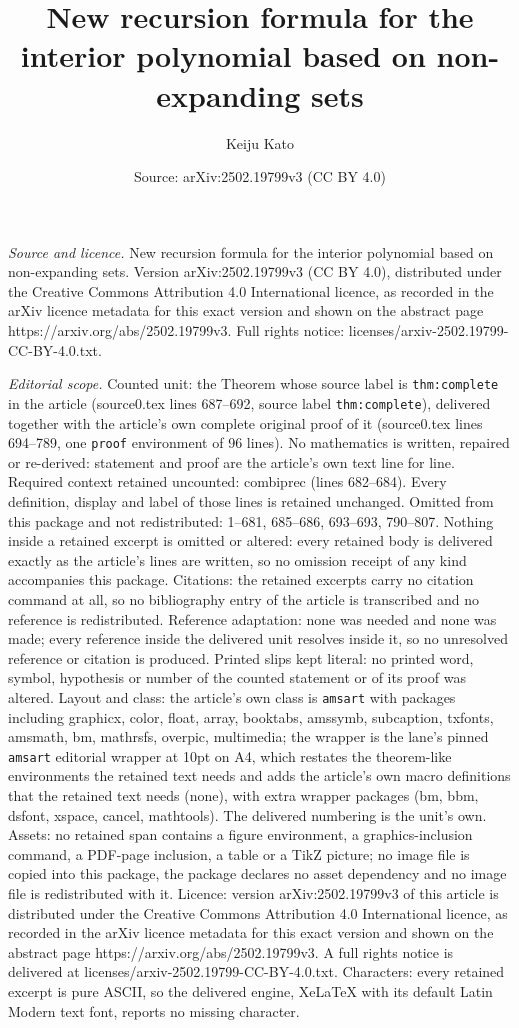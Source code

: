 \documentclass[10pt,a4paper]{amsart}
\title[New recursion formula for the interior polynomial based on n]{New recursion formula for the interior polynomial based on non-expanding sets}
\author{Keiju Kato}
\date{Source: arXiv:2502.19799v3 (CC BY 4.0)}
\begin{document}
\maketitle

\noindent\emph{Source and licence.} New recursion formula for the interior polynomial based on non-expanding sets. Version arXiv:2502.19799v3 (CC BY 4.0), distributed under the Creative Commons Attribution 4.0 International licence, as recorded in the arXiv licence metadata for this exact version and shown on the abstract page https://arxiv.org/abs/2502.19799v3. Full rights notice: licenses/arxiv-2502.19799-CC-BY-4.0.txt.\par\smallskip

\noindent\textit{Editorial scope.} Counted unit: the Theorem whose source label is \texttt{thm:complete} in the article (source0.tex lines 687--692, source label \texttt{thm:complete}), delivered together with the article's own complete original proof of it (source0.tex lines 694--789, one \texttt{proof} environment of 96 lines). No mathematics is written, repaired or re-derived: statement and proof are the article's own text line for line. Required context retained uncounted: combiprec (lines 682--684). Every definition, display and label of those lines is retained unchanged. Omitted from this package and not redistributed: 1--681, 685--686, 693--693, 790--807. Nothing inside a retained excerpt is omitted or altered: every retained body is delivered exactly as the article's lines are written, so no omission receipt of any kind accompanies this package. Citations: the retained excerpts carry no citation command at all, so no bibliography entry of the article is transcribed and no reference is redistributed. Reference adaptation: none was needed and none was made; every reference inside the delivered unit resolves inside it, so no unresolved reference or citation is produced. Printed slips kept literal: no printed word, symbol, hypothesis or number of the counted statement or of its proof was altered. Layout and class: the article's own class is \texttt{amsart} with packages including graphicx, color, float, array, booktabs, amssymb, subcaption, txfonts, amsmath, bm, mathrsfs, overpic, multimedia; the wrapper is the lane's pinned \texttt{amsart} editorial wrapper at 10pt on A4, which restates the theorem-like environments the retained text needs and adds the article's own macro definitions that the retained text needs (none), with extra wrapper packages (bm, bbm, dsfont, xspace, cancel, mathtools). The delivered numbering is the unit's own. Assets: no retained span contains a figure environment, a graphics-inclusion command, a PDF-page inclusion, a table or a TikZ picture; no image file is copied into this package, the package declares no asset dependency and no image file is redistributed with it. Licence: version arXiv:2502.19799v3 of this article is distributed under the Creative Commons Attribution 4.0 International licence, as recorded in the arXiv licence metadata for this exact version and shown on the abstract page https://arxiv.org/abs/2502.19799v3. A full rights notice is delivered at licenses/arxiv-2502.19799-CC-BY-4.0.txt. Characters: every retained excerpt is pure ASCII, so the delivered engine, XeLaTeX with its default Latin Modern text font, reports no missing character.
\end{document}
